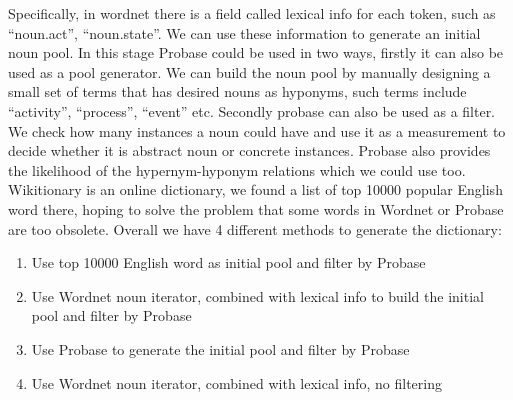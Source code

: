 Specifically, in wordnet there is a field called lexical info for each token,
such as ``noun.act'', ``noun.state''. We can use these information to generate an
initial noun pool. In this stage Probase could be used in two ways, firstly it
can also be used as a pool generator. We can build the noun pool by manually designing
a small set of terms that has desired nouns as hyponyms, such terms include ``activity'',
``process'', ``event'' etc. Secondly probase can also be used as a filter. We check how 
many instances a noun could have and use it as a measurement to decide whether it 
is abstract noun or concrete instances. Probase also provides the likelihood of 
the hypernym-hyponym relations which we could use too. Wikitionary \cite{wiktionary} is an online 
dictionary, we found a list of top 10000 popular English word there, hoping to 
solve the problem that some words in Wordnet or Probase are too obsolete.
Overall we have 4 different methods to generate the dictionary:
\begin{enumerate}
\item Use top 10000 English word as initial pool and filter by Probase
\item Use Wordnet noun iterator, combined with lexical info to build the initial pool and filter by Probase
\item Use Probase to generate the initial pool and filter by Probase
\item Use Wordnet noun iterator, combined with lexical info, no filtering
\end{enumerate}

